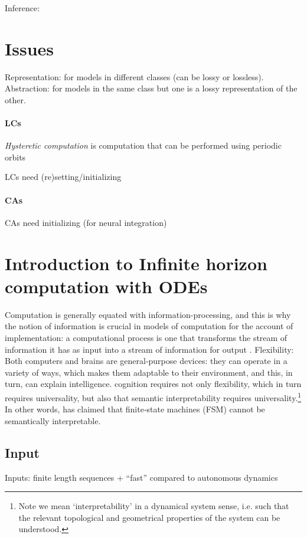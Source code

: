 \documentclass{scrartcl}
\theoremstyle{definition}
\theoremstyle{remark}
\begin{document}
Inference: 


\section*{Issues}

Representation: for models in different classes (can be lossy or lossless).
Abstraction: for models in the same class but one is a lossy representation of the other.


\paragraph{LCs}
\emph{Hysteretic computation} is computation that can be performed using periodic orbits

LCs need (re)setting/initializing

\paragraph{CAs}
CAs need initializing (for neural integration)



\newpage
\section{Introduction to Infinite horizon computation with ODEs}	
Computation is generally equated with information-processing, and this is why the notion of information is crucial in models of computation for the account of implementation: a computational process is one that transforms the stream of information it has as input into a stream of information for output \citep{milkowski2014}.
Flexibility: Both computers and brains are general‑purpose devices: they can operate in a variety of ways, which makes them adaptable to their environment, and this, in turn, can explain intelligence. \citep{milkowski2018computermetaphor}
cognition requires not only flexibility, which in turn requires universality, but also that semantic interpretability requires universality.\footnote{Note we mean ‘interpretability’ in a dynamical system sense, i.e. such that the relevant topological and geometrical properties of the system can be understood.}
 In other words, \citep{pylyshyn1984} has claimed that finite‑state machines (FSM) cannot be semantically interpretable.	


\subsection{Input}
Inputs: finite length sequences + ``fast'' compared to autonomous dynamics
\end{document}
